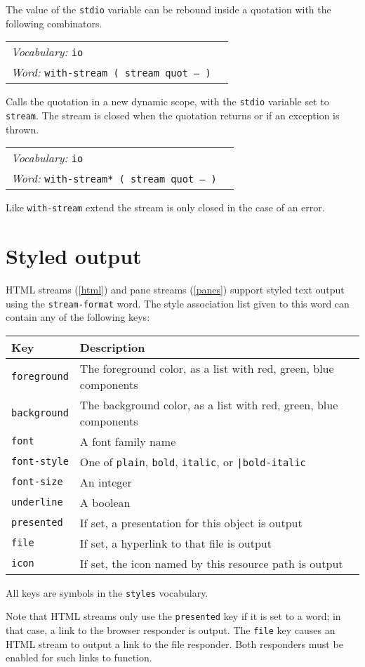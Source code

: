 \documentclass{book}
\newcommand{\ttindex}[1]{\texttt{#1}\index{\texttt{#1}}}
\newcommand{\vocabulary}[1]{\emph{Vocabulary:} \texttt{#1}&\\}
\newcommand{\ordinaryword}[2]{\index{\texttt{#1}}\emph{Word:} \texttt{#2}&\\}
\newcommand{\wordtable}[1]{


\begin{tabularx}{12cm}{lX}
\hline
#1
\hline
\end{tabularx}

}
\begin{document}
The value of the \texttt{stdio} variable can be rebound inside a quotation with the following combinators.

\wordtable{
\vocabulary{io}
\ordinaryword{with-stream}{with-stream ( stream quot -- )}
}
Calls the quotation in a new dynamic scope, with the \texttt{stdio} variable set to \texttt{stream}. The stream is closed when the quotation returns or if an exception
is thrown.
\wordtable{
\vocabulary{io}
\ordinaryword{with-stream*}{with-stream* ( stream quot -- )}
}
Like \verb|with-stream| extend the stream is only closed in the case of an error.

\section{Styled output}\label{styles}

HTML streams (\ref{html}) and pane streams (\ref{panes}) support styled text output using the \verb|stream-format| word. The style association list given to this word can contain any of the following keys:

\begin{tabular}{l|l}
Key&Description\\
\hline
\ttindex{foreground}&The foreground color, as a list with red, green, blue components\\
\ttindex{background}&The background color, as a list with red, green, blue components\\
\ttindex{font}&A font family name\\
\ttindex{font-style}&One of \ttindex{plain}, \ttindex{bold}, \ttindex{italic}, or \ttindex{|bold-italic}\\
\ttindex{font-size}&An integer\\
\ttindex{underline}&A boolean\\
\ttindex{presented}&If set, a presentation for this object is output\\
\ttindex{file}&If set, a hyperlink to that file is output\\
\ttindex{icon}&If set, the icon named by this resource path is output\\
\end{tabular}

All keys are symbols in the \verb|styles| vocabulary.

Note that
HTML streams only use the \verb|presented| key if it is set to a word; in that case, a link to the browser responder is output. The \verb|file| key causes an HTML stream to output a link to the file responder. Both responders must be enabled for such links to function.
\end{document}
